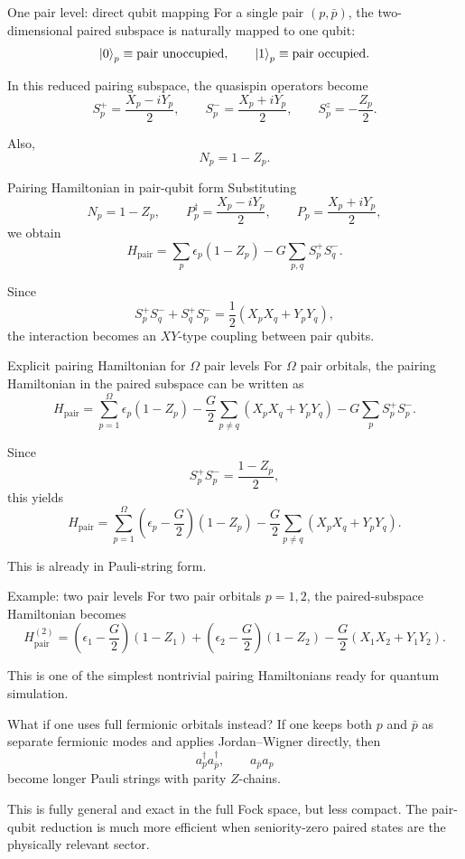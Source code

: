 \documentclass[aspectratio=169]{beamer}
\begin{document}
\begin{frame}{One pair level: direct qubit mapping}
For a single pair \((p,\bar p)\), the two-dimensional paired subspace is naturally mapped to one qubit:
\[
\ket{0}_p \equiv \text{pair unoccupied},
\qquad
\ket{1}_p \equiv \text{pair occupied}.
\]

In this reduced pairing subspace, the quasispin operators become
\[
S_p^+ = \frac{X_p-iY_p}{2},
\qquad
S_p^- = \frac{X_p+iY_p}{2},
\qquad
S_p^z = -\frac{Z_p}{2}.
\]

Also,
\[
N_p = 1 - Z_p.
\]
\end{frame}

\begin{frame}{Pairing Hamiltonian in pair-qubit form}
Substituting
\[
N_p = 1-Z_p,
\qquad
P_p^\dagger = \frac{X_p-iY_p}{2},
\qquad
P_p = \frac{X_p+iY_p}{2},
\]
we obtain
\[
H_{\mathrm{pair}}
=
\sum_p \epsilon_p (1-Z_p)
-
G\sum_{p,q} S_p^+ S_q^-.
\]

Since
\[
S_p^+S_q^- + S_q^+S_p^-
=
\frac12(X_pX_q + Y_pY_q),
\]
the interaction becomes an \(XY\)-type coupling between pair qubits.
\end{frame}

\begin{frame}{Explicit pairing Hamiltonian for \(\Omega\) pair levels}
For \(\Omega\) pair orbitals, the pairing Hamiltonian in the paired subspace can be written as
\[
H_{\mathrm{pair}}
=
\sum_{p=1}^{\Omega} \epsilon_p (1-Z_p)
-
\frac{G}{2}\sum_{p\ne q}(X_pX_q+Y_pY_q)
-
G\sum_p S_p^+S_p^-.
\]

Since
\[
S_p^+S_p^- = \frac{1-Z_p}{2},
\]
this yields
\[
H_{\mathrm{pair}}
=
\sum_{p=1}^{\Omega}\left(\epsilon_p-\frac{G}{2}\right)(1-Z_p)
-
\frac{G}{2}\sum_{p\ne q}(X_pX_q+Y_pY_q).
\]

This is already in Pauli-string form.
\end{frame}

\begin{frame}{Example: two pair levels}
For two pair orbitals \(p=1,2\), the paired-subspace Hamiltonian becomes
\[
H_{\mathrm{pair}}^{(2)}
=
\left(\epsilon_1-\frac{G}{2}\right)(1-Z_1)
+
\left(\epsilon_2-\frac{G}{2}\right)(1-Z_2)
-
\frac{G}{2}(X_1X_2+Y_1Y_2).
\]

This is one of the simplest nontrivial pairing Hamiltonians ready for quantum simulation.
\end{frame}

\begin{frame}{What if one uses full fermionic orbitals instead?}
If one keeps both \(p\) and \(\bar p\) as separate fermionic modes and applies Jordan--Wigner directly, then
\[
a_p^\dagger a_{\bar p}^\dagger,\qquad
a_{\bar p}a_p
\]
become longer Pauli strings with parity \(Z\)-chains.

This is fully general and exact in the full Fock space, but less compact.
The pair-qubit reduction is much more efficient when seniority-zero paired states are the physically relevant sector.
\end{frame}
\end{document}
